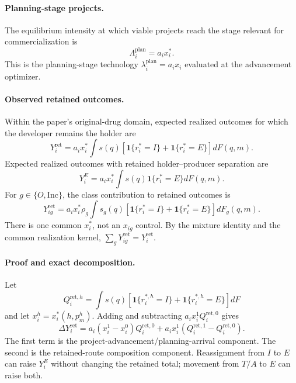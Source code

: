 \paragraph{Planning-stage projects.}
The equilibrium intensity at which viable projects reach the stage relevant
for commercialization is
\begin{equation}
  \Lambda_i^{\mathrm{plan}}
  =
  a_ix_i^*.
  \label{eq:p08-planning-arrival}
\end{equation}
This is the planning-stage technology
\(\lambda_i^{\mathrm{plan}}=a_ix_i\) evaluated at the advancement optimizer.

\paragraph{Observed retained outcomes.}
Within the paper's original-drug domain, expected realized outcomes for which
the developer remains the holder are
\begin{equation}
  Y_i^{\mathrm{ret}}
  =
  a_ix_i^*
  \int
  s(q)
  \left[
    \mathbf 1\{r_i^*=I\}
    +
    \mathbf 1\{r_i^*=E\}
  \right]
  dF(q,m).
  \label{eq:p08-retained-outcome}
\end{equation}
Expected realized outcomes with retained holder--producer separation are
\begin{equation}
  Y_i^E
  =
  a_ix_i^*
  \int
  s(q)\mathbf 1\{r_i^*=E\}
  dF(q,m).
  \label{eq:p08-entrusted-outcome}
\end{equation}
For \(g\in\{O,\mathrm{Inc}\}\), the class contribution to retained
outcomes is
\begin{equation}
  Y_{ig}^{\mathrm{ret}}
  =
  a_ix_i^*\rho_g
  \int
  s_g(q)
  \left[
    \mathbf 1\{r_i^*=I\}
    +
    \mathbf 1\{r_i^*=E\}
  \right]
  dF_g(q,m).
  \label{eq:p08-type-outcome}
\end{equation}
There is one common \(x_i^*\), not an \(x_{ig}\) control. By the mixture
identity and the common realization kernel,
\(\sum_g Y_{ig}^{\mathrm{ret}}=Y_i^{\mathrm{ret}}\).

\paragraph{Proof and exact decomposition.}
Let
\[
  Q_i^{\mathrm{ret},h}
  =
  \int s(q)
  [\mathbf 1\{r_i^{*,h}=I\}+\mathbf 1\{r_i^{*,h}=E\}]
  dF
\]
and let \(x_i^h=x_i^*(h,p_m^h)\). Adding and subtracting
\(a_ix_i^1Q_i^{\mathrm{ret},0}\) gives
\begin{equation}
  \Delta Y_i^{\mathrm{ret}}
  =
  a_i(x_i^1-x_i^0)Q_i^{\mathrm{ret},0}
  +
  a_ix_i^1
  (Q_i^{\mathrm{ret},1}-Q_i^{\mathrm{ret},0}).
  \label{eq:p08-outcome-decomposition}
\end{equation}
The first term is the project-advancement/planning-arrival component. The
second is the retained-route composition component. Reassignment from \(I\)
to \(E\) can raise \(Y_i^E\) without changing the retained total; movement
from \(T/A\) to \(E\) can raise both.


